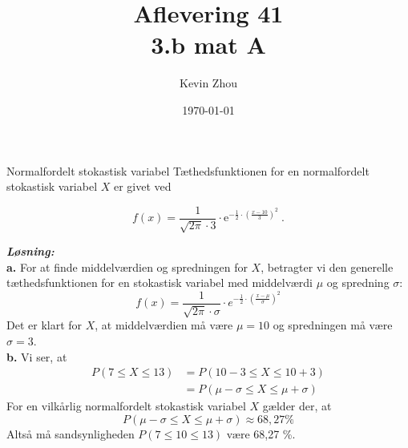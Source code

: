 \documentclass{article}
\title{Aflevering 41\\
{\Large \textbf{3.b mat A}}}
\author{Kevin Zhou}
\date{\today}
\newcommand{\sol}{\setlength{\parindent}{0cm}\textbf{\textit{Løsning:}}\setlength{\parindent}{1cm}}
\begin{document}
\maketitle
\newpage
\begin{question}{Normalfordelt stokastisk variabel}{}
 Tæthedsfunktionen for en normalfordelt stokastisk variabel $X$ er givet ved

$$f(x)=\frac{1}{\sqrt{2\pi}\cdot3}\cdot\mathrm{e}^{-\frac{1}{2}\cdot\left(\frac{x-10}{3}\right)^2}\:.$$
\end{question}
\sol \\
\textbf{a.}
For at finde middelværdien og spredningen for $X$, betragter vi den generelle tæthedsfunktionen for en stokastisk variabel med middelværdi $\mu $ og spredning $\sigma $:
\[
f(x)= \frac{1}{\sqrt{2 \pi } \cdot \sigma } \cdot e^{-\frac{1}{2} \cdot \left(\frac{x- \mu }{\sigma }\right)^2} 
\] 
Det er klart for $X$, at middelværdien må være $\mu =10$ og spredningen må være $\sigma = 3$. \\[1ex]
\textbf{b.}
Vi ser, at 
\begin{equation*}
\begin{split}
  P(7 \leq X \leq 13) &= P(10-3 \leq X \leq 10 + 3)\\
  &=P(\mu - \sigma \leq X \leq \mu + \sigma )
\end{split}
\end{equation*}
For en vilkårlig normalfordelt stokastisk variabel $X$ gælder der, at 
\[
P(\mu - \sigma \leq X \leq \mu + \sigma )\approx 68,27 \% 
\] 
Altså må sandsynligheden $P(7 \leq 10 \leq 13)$ være 68,27 \%. 
\end{document}
